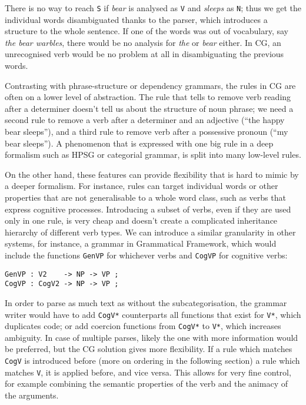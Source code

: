 There is no way to reach \texttt{S} if \emph{bear} is analysed as
\texttt{V} and \emph{sleeps} as \texttt{N}; thus we get the individual
words disambiguated thanks to the parser, which introduces a structure
to the whole sentence. If one of the words was out of vocabulary, say
\emph{the bear warbles}, there would be no analysis for \emph{the} or
\emph{bear} either. In CG, an unrecognised verb would be no problem at
all in disambiguating the previous words.


Contrasting with phrase-structure or dependency grammars, the rules in
CG are often on a lower level of abstraction. 
The rule that tells to remove verb reading after a determiner
doesn't tell us about the structure of noun phrase; we need a second
rule to remove a verb after a determiner and an adjective (``the happy
bear sleeps''), and a third rule to remove verb after a possessive
pronoun (``my bear sleeps''). A phenomenon that is expressed with one
big rule in a deep formalism such as HPSG or categorial grammar, is
split into many low-level rules.

On the other hand, these features can provide
flexibility that is hard to mimic by a deeper formalism.
For instance, rules can target individual words
or other properties that are not generalisable to a whole word class,
such as verbs that express cognitive processes.
Introducing a subset of verbs, even if they are used only in one rule,
is very cheap and doesn't create a complicated inheritance hierarchy
of different verb types.
We can introduce a similar granularity in other systems, for instance,
a grammar in Grammatical Framework, which would include the functions
\texttt{GenVP} for whichever verbs and \texttt{CogVP} for cognitive verbs:


\begin{verbatim}
GenVP : V2    -> NP -> VP ;
CogVP : CogV2 -> NP -> VP ;
\end{verbatim}

In order to parse as much text as without the subcategorisation, the
grammar writer would have to add \texttt{CogV*} counterparts all
functions that exist for \texttt{V*}, which duplicates code; or add
coercion functions from  \texttt{CogV*} to \texttt{V*}, which increases ambiguity.
In case of multiple parses, likely the one with more information
would be preferred, but the CG solution gives more flexibility. If a
rule which matches \texttt{CogV} is introduced before (more on
ordering in the following section) a rule which matches \texttt{V}, it
is applied before, and vice versa. This allows for very fine control,
for example combining the semantic properties of the verb and the
animacy of the arguments.

